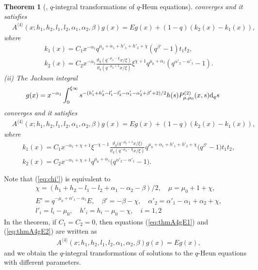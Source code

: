 \documentclass[12pt]{amsart}
\numberwithin{equation}{section}
\newtheorem{thm}{Theorem}[section]
\theoremstyle{definition}
\theoremstyle{remark}
\begin{document}
\begin{thm} [\cite{TakK}, $q$-integral transformations of $q$-Heun equations]
converges and it satisfies
\begin{align}
& A^{\langle 4 \rangle} ( x;  h_1, h_2, l_1, l_2, \alpha _1, \alpha _2, \beta  ) g (x) =  E g(x) + (1-q) (k_2 (x) - k_1 (x)), \label{eq:thmA4gE1}
\end{align}
where
\begin{align*}
& k_1 (x)= C_1 x^{- \alpha _1} q^{\mu _0 + \alpha _1 + h'_1 + h'_2 + \chi } ( q^{ \beta ' } - 1 ) t_1 t_2 ,  \\
& k_2(x)= C_2 x^{- \alpha _1 } \frac{\vartheta _q (q^{- \mu _0 - \chi } x/\xi  )}{\vartheta _q (q^{- \mu _0 +1 } x/\xi  )} \xi ^{\chi + 1 } q^{\mu _0 + \alpha _1 } ( q^{\alpha ' _2 - \alpha '_1}  -  1 ) . \nonumber
\end{align*}
(ii)  The Jackson integral
\begin{align}
& g(x) = x^{-\alpha_{1}} \int_{0}^{\xi \infty} s^{-(h_{1}' + h_{2}' - l_{1}' - l_{2}' - \alpha_{1}' - \alpha_{2}' + \beta' + 2)/2} h(s) P_{\mu, \mu_{0}}^{(2)} (x, s) {\rm{d}}_{q}s \label{eq:A4Jint2}
\end{align}
converges and it satisfies
\begin{align}
& A^{\langle 4 \rangle} ( x;  h_1, h_2, l_1, l_2, \alpha _1, \alpha _2, \beta  ) g (x) =  E g(x) + (1-q) (k_2 (x) - k_1 (x)), \label{eq:thmA4gE2}
\end{align}
where 
\begin{align*}
& k_{1}(x) = C_{1} x^{- \alpha _1+ \chi +1} \xi ^{ -\chi -1 } \frac{\vartheta_{q} \big(q^{- \mu _0 +1 } x/\xi \big)}{\vartheta_{q} (q^{- \mu _0 -\chi } x/\xi )} q^{\mu_{0 }+ \alpha_{1} + h'_{1} + h'_{2} + \chi } \big( q^{ \beta' } - 1 \big) t_{1} t_{2}, \\
& k_{2}(x) = C_{2} x^{- \alpha _1 + \chi +1} q^{\mu_{0} + \alpha _1 } \big( q^{\alpha'_{2} - \alpha'_{1}} - 1 \big)
 . \nonumber 
\end{align*}
\end{thm}
Note that (\ref{eq:chi'}) is equivalent to 
\begin{align}
    &\chi = (h_{1} + h_{2} - l_{1} - l_{2} + \alpha_{1} - \alpha_{2} - \beta )/2, \quad \mu = \mu_{0} + 1 + \chi,  \label{eq:chi} \\
    &E' = q^{- \mu_{0} + \alpha '_{1} - \alpha_{1}} E, \quad \beta ' = -\beta - \chi, \quad \alpha '_{2} = \alpha ' _{1} - \alpha_{1} + \alpha_{2} + \chi, \nonumber \\
    &l'_{i} = l_{i} - \mu_{0}, \quad h'_{i} = h_{i} - \mu_{0} - \chi, \quad i = 1, 2 \nonumber 
 \end{align}
In the theorem, if $C_1=C_2=0$, then equations (\ref{eq:thmA4gE1}) and (\ref{eq:thmA4gE2}) are written as
\begin{align*}
& A^{\langle 4 \rangle} ( x;  h_1, h_2, l_1, l_2, \alpha _1, \alpha _2, \beta  ) g (x) =  E g(x) ,
\end{align*}
and we obtain the $q$-integral transformations of solutions to the $q$-Heun equations with different parameters.
\end{document}
